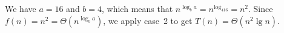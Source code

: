 We have $a=16$ and $b=4$, which means that $n^{\log_ba}=n^{\log_416}=n^2$.
Since $f(n)=n^2=\Theta(n^{\log_ba})$, we apply case~2 to get $T(n)=\Theta(n^2\lg n)$.
